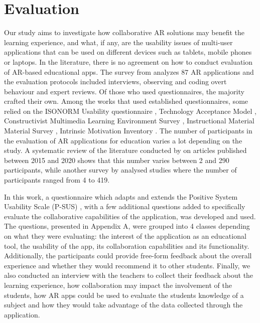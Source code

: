 \documentclass[pdflatex,sn-basic,iicol]{sn-jnl}%
\begin{document}
\section{Evaluation}\label{sec:evaluation}

Our study aims to investigate how collaborative AR solutions may benefit the learning experience, and what, if any, are the usability issues of multi-user applications that can be used on different devices such as tablets, mobile phones or laptops. In the literature, there is no agreement on how to conduct evaluation of AR-based educational apps. The survey from \cite{santos2013augmented} analyzes 87 AR applications and the evaluation protocols included interviews, observing and coding overt behaviour and expert reviews. Of those who used questionnaires, the majority crafted their own. Among the works that used established questionnaires, some relied on the ISONORM Usability questionnaire \citep{prumper1999test}, Technology Acceptance Model \citep{davis1996critical}, Constructivist Multimedia Learning Environment Survey \citep{maor1999teacher}, Instructional Material Material Survey \citep{keller1987development}, Intrinsic Motivation Inventory \citep{ryan2000self}. The number of participants in the evaluation of AR applications for education varies a lot depending on the study. A systematic review of the literature conducted by \cite{masneri2020work} on articles published between 2015 and 2020 shows that this number varies between 2 and 290 participants, while another survey by \cite{santos2013augmented} analysed studies where the number of participants ranged from 4 to 419.

In this work, a questionnaire which adapts and extends the Positive System Usability Scale (P-SUS) \citep{brooke1996sus, sauro2011designing}, with a few additional questions added to specifically evaluate the collaborative capabilities of the application, was developed and used. The questions, presented in Appendix A, were grouped into 4 classes depending on what they were evaluating: the interest of the application as an educational tool, the usability of the app, its collaboration capabilities and its functionality. Additionally, the participants could provide free-form feedback about the overall experience and whether they would recommend it to other students. Finally, we also conducted an interview with the teachers to collect their feedback about the learning experience, how collaboration may impact the involvement of the students, how  AR apps could be used to evaluate the students knowledge of a subject and how they would take advantage of the data collected through the application.
\end{document}
